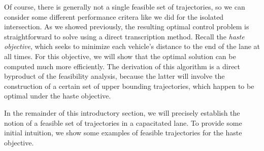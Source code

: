 \documentclass[a4paper]{report}
\theoremstyle{definition}
\theoremstyle{plain}
\begin{document}
Of course, there is generally not a single feasible set of trajectories, so we
can consider some different performance critera like we did for the isolated
intersection.
%
As we showed previously, the resulting optimal control problem is
straightforward to solve using a direct transcription method.
%
Recall the \emph{haste objective}, which seeks to minimize each vehicle's distance to
the end of the lane at all times. For this objective, we will show that the
optimal solution can be computed much more efficiently.
%
The derivation of this algorithm is a direct byproduct of the feasibility
analysis, because the latter will involve the construction of a certain set of
upper bounding trajectories, which happen to be optimal under the haste
objective.

In the remainder of this introductory section, we will precisely establish the
notion of a feasible set of trajectories in a capacitated lane. To provide some
initial intuition, we show some examples of feasible trajectories for the haste
objective.
\end{document}
